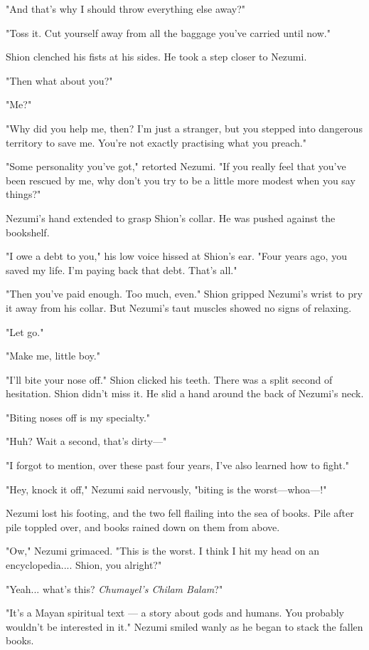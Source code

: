 "And that's why I should throw everything else away?"

"Toss it. Cut yourself away from all the baggage you've carried until
now."

Shion clenched his fists at his sides. He took a step closer to Nezumi.

"Then what about you?"

"Me?"

"Why did you help me, then? I'm just a stranger, but you stepped into
dangerous territory to save me. You're not exactly practising what you
preach."

"Some personality you've got," retorted Nezumi. "If you really feel that
you've been rescued by me, why don't you try to be a little more modest
when you say things?"

Nezumi's hand extended to grasp Shion's collar. He was pushed against
the bookshelf.

"I owe a debt to you," his low voice hissed at Shion's ear. "Four years
ago, you saved my life. I'm paying back that debt. That's all."

"Then you've paid enough. Too much, even." Shion gripped Nezumi's wrist
to pry it away from his collar. But Nezumi's taut muscles showed no
signs of relaxing.

"Let go."

"Make me, little boy."

"I'll bite your nose off." Shion clicked his teeth. There was a split
second of hesitation. Shion didn't miss it. He slid a hand around the
back of Nezumi's neck.

"Biting noses off is my specialty."

"Huh? Wait a second, that's dirty---"

"I forgot to mention, over these past four years, I've also learned how
to fight."

"Hey, knock it off," Nezumi said nervously, "biting is the worst---whoa---!"

Nezumi lost his footing, and the two fell flailing into the sea of
books. Pile after pile toppled over, and books rained down on them from
above.

"Ow," Nezumi grimaced. "This is the worst. I think I hit my head on an
encyclopedia.... Shion, you alright?"

"Yeah... what's this? \emph{Chumayel's Chilam Balam}?"

"It's a Mayan spiritual text --- a story about gods and humans. You
probably wouldn't be interested in it." Nezumi smiled wanly as he began
to stack the fallen books.

